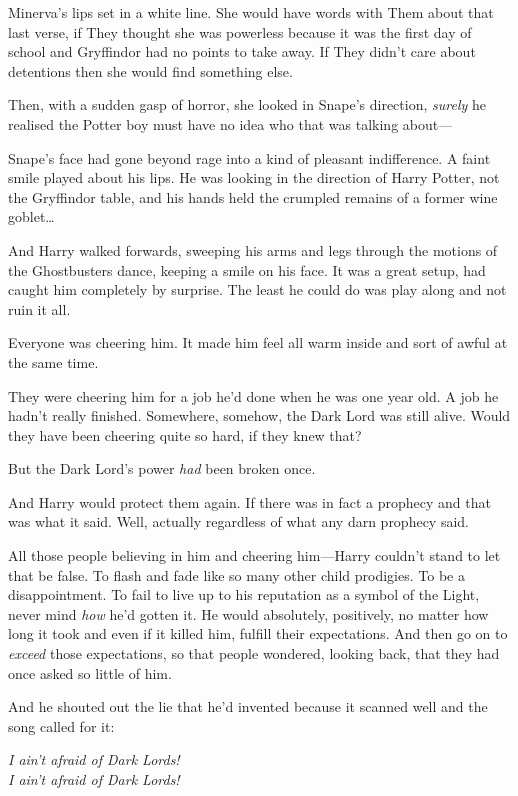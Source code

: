 Minerva's lips set in a white line. She would have words with Them about that 
last verse, if They thought she was powerless because it was the first day of 
school and Gryffindor had no points to take away. If They didn't care about 
detentions then she would find something else.

Then, with a sudden gasp of horror, she looked in Snape's direction, 
\emph{surely} he realised the Potter boy must have no idea who that was talking 
about---

Snape's face had gone beyond rage into a kind of pleasant indifference. A faint 
smile played about his lips. He was looking in the direction of Harry Potter, 
not the Gryffindor table, and his hands held the crumpled remains of a former 
wine goblet{\ldots}

And Harry walked forwards, sweeping his arms and legs through the motions of 
the Ghostbusters dance, keeping a smile on his face. It was a great setup, had 
caught him completely by surprise. The least he could do was play along and not 
ruin it all.

Everyone was cheering him. It made him feel all warm inside and sort of awful 
at the same time.

They were cheering him for a job he'd done when he was one year old. A job he 
hadn't really finished. Somewhere, somehow, the Dark Lord was still alive. 
Would they have been cheering quite so hard, if they knew that?

But the Dark Lord's power \emph{had} been broken once.

And Harry would protect them again. If there was in fact a prophecy and that 
was what it said. Well, actually regardless of what any darn prophecy said.

All those people believing in him and cheering him---Harry couldn't stand to 
let that be false. To flash and fade like so many other child prodigies. To be 
a disappointment. To fail to live up to his reputation as a symbol of the 
Light, never mind \emph{how} he'd gotten it. He would absolutely, positively, 
no matter how long it took and even if it killed him, fulfill their 
expectations. And then go on to \emph{exceed} those expectations, so that 
people wondered, looking back, that they had once asked so little of him.

And he shouted out the lie that he'd invented because it scanned well and the 
song called for it:

\begin{center}
\emph{I ain't afraid of Dark Lords!\\
I ain't afraid of Dark Lords!}
\end{center}

